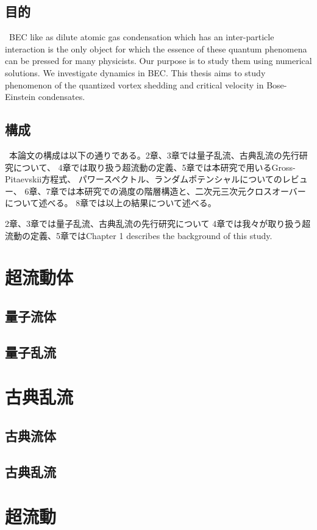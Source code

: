 \documentclass[12pt,a4paper]{jbook}
\begin{document}
\section{目的}
\ BEC like as dilute atomic gas condensation which has an inter-particle interaction
is the only object for which the essence of
these quantum phenomena can be pressed for many physicists.
Our purpose is to study them using numerical solutions.
We investigate dynamics in BEC.
This thesis aims to study phenomenon of the quantized vortex shedding
and critical velocity in Bose-Einstein condensates.

\section{構成}
\ 本論文の構成は以下の通りである。2章、3章では量子乱流、古典乱流の先行研究について、
4章では取り扱う超流動の定義、5章では本研究で用いるGross-Pitaevskii方程式、
パワースペクトル、ランダムポテンシャルについてのレビュー、
6章、7章では本研究での渦度の階層構造と、二次元三次元クロスオーバーについて述べる。
8章では以上の結果について述べる。


2章、3章では量子乱流、古典乱流の先行研究について
4章では我々が取り扱う超流動の定義、5章ではChapter 1 describes the background of this study.

\chapter{超流動体}

\section{量子流体}
\section{量子乱流}

\chapter{古典乱流}
\section{古典流体}
\section{古典乱流}

\chapter{超流動}
\end{document}
